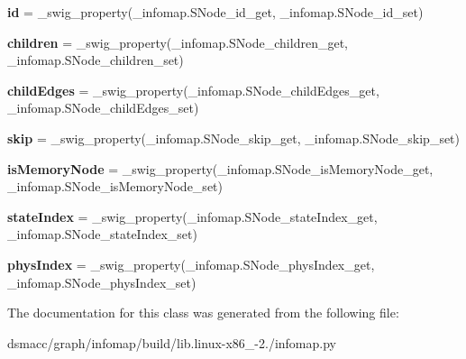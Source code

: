 \begin{DoxyCompactItemize}
\item 
\mbox{\label{classinfomap_1_1SNode_a3a10090f72071f35155ab513a8a91f37}} 
{\bfseries id} = \+\_\+swig\+\_\+property(\+\_\+infomap.\+S\+Node\+\_\+id\+\_\+get, \+\_\+infomap.\+S\+Node\+\_\+id\+\_\+set)
\item 
\mbox{\label{classinfomap_1_1SNode_a3cbafc37a4bf0162734fd69b8e8cf051}} 
{\bfseries children} = \+\_\+swig\+\_\+property(\+\_\+infomap.\+S\+Node\+\_\+children\+\_\+get, \+\_\+infomap.\+S\+Node\+\_\+children\+\_\+set)
\item 
\mbox{\label{classinfomap_1_1SNode_adc2b9cebaf482554b2a2e41871065ccd}} 
{\bfseries child\+Edges} = \+\_\+swig\+\_\+property(\+\_\+infomap.\+S\+Node\+\_\+child\+Edges\+\_\+get, \+\_\+infomap.\+S\+Node\+\_\+child\+Edges\+\_\+set)
\item 
\mbox{\label{classinfomap_1_1SNode_a6653f74b24765a2999aa45b348332ab1}} 
{\bfseries skip} = \+\_\+swig\+\_\+property(\+\_\+infomap.\+S\+Node\+\_\+skip\+\_\+get, \+\_\+infomap.\+S\+Node\+\_\+skip\+\_\+set)
\item 
\mbox{\label{classinfomap_1_1SNode_aeb9bf9ca2933281f76abc32fd11a5374}} 
{\bfseries is\+Memory\+Node} = \+\_\+swig\+\_\+property(\+\_\+infomap.\+S\+Node\+\_\+is\+Memory\+Node\+\_\+get, \+\_\+infomap.\+S\+Node\+\_\+is\+Memory\+Node\+\_\+set)
\item 
\mbox{\label{classinfomap_1_1SNode_ae08519bb6cdfd5af851a1cc041ed0ce0}} 
{\bfseries state\+Index} = \+\_\+swig\+\_\+property(\+\_\+infomap.\+S\+Node\+\_\+state\+Index\+\_\+get, \+\_\+infomap.\+S\+Node\+\_\+state\+Index\+\_\+set)
\item 
\mbox{\label{classinfomap_1_1SNode_a1be9664faaf5c1b03948d0b1c56d1b20}} 
{\bfseries phys\+Index} = \+\_\+swig\+\_\+property(\+\_\+infomap.\+S\+Node\+\_\+phys\+Index\+\_\+get, \+\_\+infomap.\+S\+Node\+\_\+phys\+Index\+\_\+set)
\end{DoxyCompactItemize}


The documentation for this class was generated from the following file\+:\begin{DoxyCompactItemize}
\item 
dsmacc/graph/infomap/build/lib.\+linux-\/x86\+\_-\/2./infomap.\+py\end{DoxyCompactItemize}
